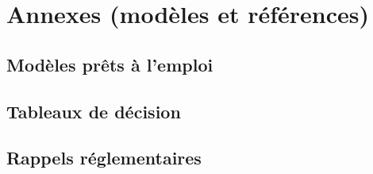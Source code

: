 \documentclass[../../main.tex]{subfiles}
\begin{document}
\chapter{Annexes (modèles et références)}

\section*{Modèles prêts à l'emploi}

\section*{Tableaux de décision}

\section*{Rappels réglementaires}
\end{document}
